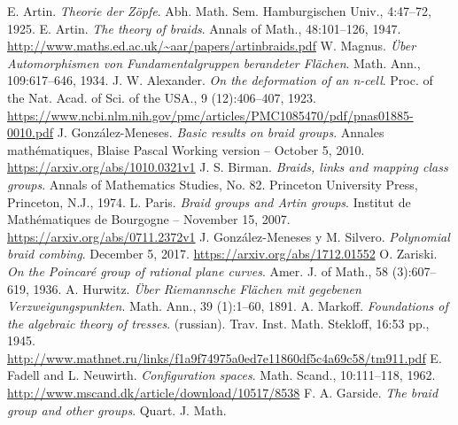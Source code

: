 \documentclass[TFG.tex]{subfiles}
\begin{document}
%

\begin{thebibliography}{}
 E. Artin. \emph{Theorie der Zöpfe}. Abh. Math. Sem. Hamburgischen Univ.,
4:47–72, 1925.
 E. Artin. \emph{The theory of braids}. Annals of Math., 48:101–126, 1947. \url{http://www.maths.ed.ac.uk/~aar/papers/artinbraids.pdf}
 W. Magnus. \emph{Über Automorphismen von Fundamentalgruppen berandeter
Flächen}. Math. Ann., 109:617–646, 1934.
 J. W. Alexander. \emph{On the deformation of an n-cell}. Proc. of the Nat.
Acad. of Sci. of the USA., 9 (12):406–407, 1923. \url{https://www.ncbi.nlm.nih.gov/pmc/articles/PMC1085470/pdf/pnas01885-0010.pdf}
 J. González-Meneses. \emph{Basic results on braid groups}. Annales mathématiques, Blaise Pascal Working version – October 5, 2010. \url{https://arxiv.org/abs/1010.0321v1}
 J. S. Birman. \emph{Braids, links and mapping class groups}. Annals of Mathematics
Studies, No. 82. Princeton University Press, Princeton, N.J.,
1974.
 L. Paris. \textit{Braid groups and Artin groups}. Institut de Mathématiques de Bourgogne – November 15, 2007. \url{https://arxiv.org/abs/0711.2372v1}
 J. González-Meneses y M. Silvero. \emph{Polynomial braid combing}. December 5, 2017. \url{https://arxiv.org/abs/1712.01552}
 O. Zariski. \emph{On the Poincaré group of rational plane curves}. Amer. J.
of Math., 58 (3):607–619, 1936.
 A. Hurwitz. \emph{Über Riemannsche Flächen mit gegebenen Verzweigungspunkten}.
Math. Ann., 39 (1):1–60, 1891.
 A. Markoff. \emph{Foundations of the algebraic theory of tresses}. (russian).
Trav. Inst. Math. Stekloff, 16:53 pp., 1945. \url{http://www.mathnet.ru/links/f1a9f74975a0ed7e11860df5c4a69c58/tm911.pdf}
  E. Fadell and L. Neuwirth. \emph{Configuration spaces}. Math. Scand.,
10:111–118, 1962. \url{http://www.mscand.dk/article/download/10517/8538}
 F. A. Garside. \emph{The braid group and other groups}. Quart. J. Math.

\end{thebibliography}
\end{document}
